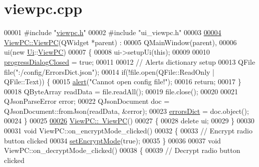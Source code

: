 \hypertarget{viewpc_8cpp_source}{}\section{viewpc.\+cpp}
\label{viewpc_8cpp_source}

\begin{DoxyCode}
00001 \textcolor{preprocessor}{#include "\mbox{\hyperlink{viewpc_8h}{viewpc.h}}"}
00002 \textcolor{preprocessor}{#include "ui\_viewpc.h"}
00003 
\mbox{\hyperlink{class_view_p_c_a33c96c61f61042319c66c19059836b7f}{00004}} \mbox{\hyperlink{class_view_p_c_a33c96c61f61042319c66c19059836b7f}{ViewPC::ViewPC}}(QWidget *parent) :
00005     QMainWindow(parent),
00006     ui(new \mbox{\hyperlink{namespace_ui}{Ui}}::\mbox{\hyperlink{class_view_p_c}{ViewPC}})
00007 \{
00008     ui->setupUi(\textcolor{keyword}{this});
00009 
00010     \mbox{\hyperlink{class_view_p_c_add8c82aa2b0b934212aa5bde9277ab36}{progressDialogClosed}} = \textcolor{keyword}{true};
00011 
00012     \textcolor{comment}{// Alerts dictionary setup}
00013     QFile file(\textcolor{stringliteral}{":/config/ErrorsDict.json"});
00014     \textcolor{keywordflow}{if}(!file.open(QFile::ReadOnly | QFile::Text)) \{
00015         \mbox{\hyperlink{class_view_p_c_a7c467169467789561078abc9d4fe57bd}{alert}}(\textcolor{stringliteral}{"Cannot open config file!"});
00016         \textcolor{keywordflow}{return};
00017     \}
00018     QByteArray readData = file.readAll();
00019     file.close();
00020 
00021     QJsonParseError error;
00022     QJsonDocument doc = QJsonDocument::fromJson(readData, &error);
00023     \mbox{\hyperlink{class_view_p_c_a26f90436aca32e5bad46f5e69a7e7e09}{errorsDict}} = doc.object();
00024 \}
00025 
\mbox{\hyperlink{class_view_p_c_a91c51f5c1e6ed5ab12b410339f469b0f}{00026}} \mbox{\hyperlink{class_view_p_c_a91c51f5c1e6ed5ab12b410339f469b0f}{ViewPC::~ViewPC}}()
00027 \{
00028     \textcolor{keyword}{delete} ui;
00029 \}
00030 
00031 \textcolor{keywordtype}{void} ViewPC::on\_encryptMode\_clicked()
00032 \{
00033     \textcolor{comment}{// Encrypt radio button clicked}
00034     \mbox{\hyperlink{class_view_p_c_a5b48951efefdc0e3039c9a4bf185320b}{setEncryptMode}}(\textcolor{keyword}{true});
00035 \}
00036 
00037 \textcolor{keywordtype}{void} ViewPC::on\_decryptMode\_clicked()
00038 \{
00039     \textcolor{comment}{// Decrypt radio button clicked}

\end{DoxyCode}

